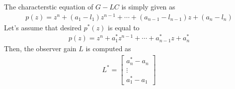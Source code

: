 \documentclass[twoside]{article}
\begin{document}
%
The characterstic equation of $G - LC$ is simply given as
%
\begin{align*}
  p(z) = z^n + ( a_1 - l_1 ) z^{n-1} + \cdots + ( a_{n-1} - l_{n-1} )
  z + ( a_{n} - l_{n} )
\end{align*}
%
Let's assume that desired $p^*(z)$ is equal to
%
\begin{align*}
  p(z) = z^n + a_1^* z^{n-1} + \cdots + a_{n-1}^* 
  z + a_{n}^*
\end{align*}
%
Then, the observer gain $L$ is computed as
%
\begin{align*}
L^* = \left[ \begin{array}{c} a_n^* - a_n \\ \vdots \\ a_1^* - a_1 \end{array} \right]
\end{align*}
\end{document}
